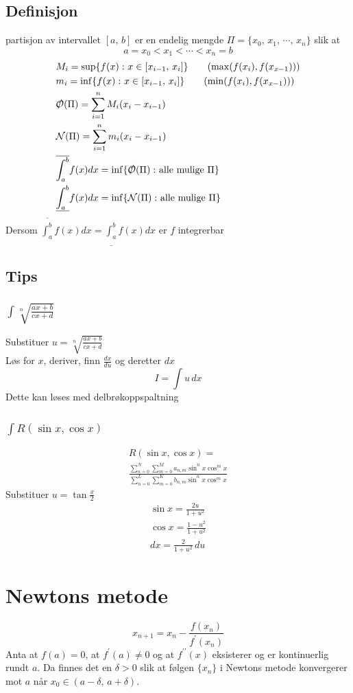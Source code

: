 \documentclass[defaultpackages]{cheatsheet}
\newcommand*{\Oe}{\slashed{\mathcal O}}
\begin{document}
	\subsection{Definisjon}
	partisjon av intervallet $[a,\,b]$ er en endelig mengde $\Pi = \{x_0,\,x_1,\,\cdots,\,x_n\}$ slik at 
	\[a = x_0<x_1<\cdots<x_n=b\]
	\begin{align*}
		&M_i = \sup\{f(x) \,\colon x\in [x_{i-1},\,x_i]\}\tag{$\max(f(x_i), f(x_{x-1}))$}\\
		&m_i = \inf\{f(x) \,\colon x\in [x_{i-1},\,x_i]\}\tag{$\min(f(x_i), f(x_{x-1}))$}\\
		&\Oe(\Pi) = \sum_{i=1}^{n} M_i(x_i-x_{i-1})\\
		&\mathcal{N}(\Pi) = \sum_{i=1}^n m_i(x_i-x_{i-1})\\
		&\overline{\int_a^b} f(x) dx = \inf\{\Oe(\Pi)\,\colon\text{alle mulige } \Pi\}\\
		&\underline{\int_a^b} f(x) dx = \inf\{\mathcal{N}(\Pi)\,\colon\text{alle mulige } \Pi\}
	\end{align*}
	Dersom $\overline{\int_a^b} f(x) dx = \underline{\int_a^b} f(x) dx$ er $f$ integrerbar
	\subsection{Tips}
	\subsubsection{$\int \sqrt[n]{\frac{ax+b}{cx+d}}$}
	Substituer $u=\sqrt[n]{\frac{ax+b}{cx+d}}$\\
	Løs for $x$, deriver, finn $\frac{dx}{du}$ og deretter $dx$
	\[I = \int u \,dx\]
	Dette kan løses med delbrøkoppspaltning
	\subsubsection{$\int R(\sin x, \cos x)$}
	\begin{gather*}
		R(\sin x, \cos x)=\\
		 \frac{\displaystyle\sum_{n=0}^N\sum_{m=0}^M a_{n,m}\sin^n x\cos^m x}{\displaystyle\sum_{n=0}^L\sum_{m=0}^K b_{n,m}\sin^n x\cos^m x}
	\end{gather*}
	Substituer $u=\tan\frac{x}{2}$
	\begin{gather*}
		\sin x = \frac{2u}{1+u^2}\\
		\cos x = \frac{1-u^2}{1+u^2}\\
		dx = \frac{2}{1+u^2}\,du
	\end{gather*}
\section{Newtons metode}
	\phantom{}
	\[x_{n+1} = x_n - \frac{f(x_n)}{f^\prime(x_n)}\]
	Anta at $f(a)=0$, at $f^\prime(a)\neq 0$ og at $f^{\prime\prime}(x)$ eksisterer og er kontinuerlig rundt $a$. Da finnes det en $\delta > 0$ slik at følgen $\{x_n\}$ i Newtons metode konvergerer mot $a$ når $x_0\in (a-\delta,\,a+\delta)$. 
\end{document}
